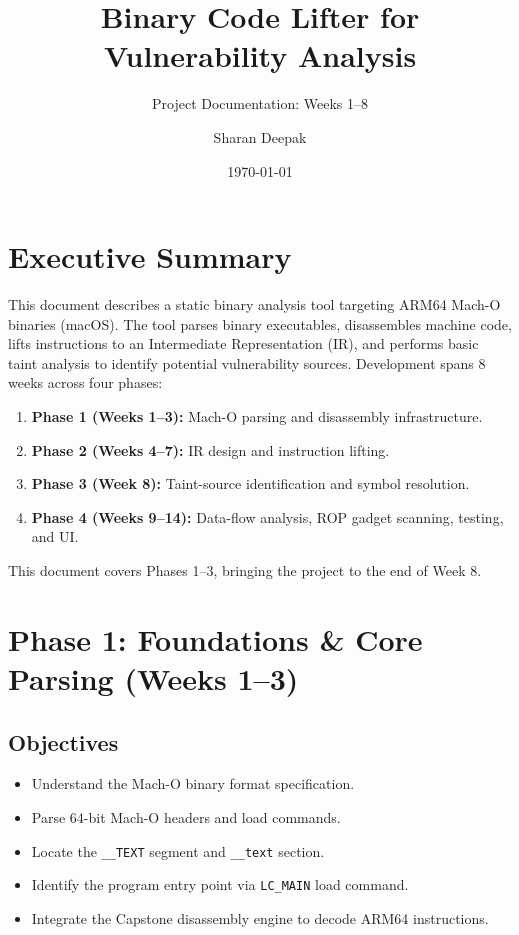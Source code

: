 \documentclass[12pt,a4paper]{article}
\title{Binary Code Lifter for Vulnerability Analysis}
\subtitle{Project Documentation: Weeks 1--8}
\author{Sharan Deepak}
\date{\today}
\begin{document}
\maketitle

\tableofcontents
\newpage

\section{Executive Summary}

This document describes a static binary analysis tool targeting ARM64 Mach-O binaries (macOS). The tool parses binary executables, disassembles machine code, lifts instructions to an Intermediate Representation (IR), and performs basic taint analysis to identify potential vulnerability sources. Development spans 8 weeks across four phases:

\begin{enumerate}
  \item \textbf{Phase 1 (Weeks 1--3):} Mach-O parsing and disassembly infrastructure.
  \item \textbf{Phase 2 (Weeks 4--7):} IR design and instruction lifting.
  \item \textbf{Phase 3 (Week 8):} Taint-source identification and symbol resolution.
  \item \textbf{Phase 4 (Weeks 9--14):} Data-flow analysis, ROP gadget scanning, testing, and UI.
\end{enumerate}

This document covers Phases 1--3, bringing the project to the end of Week 8.

\newpage

\section{Phase 1: Foundations \& Core Parsing (Weeks 1--3)}

\subsection{Objectives}

\begin{itemize}
  \item Understand the Mach-O binary format specification.
  \item Parse 64-bit Mach-O headers and load commands.
  \item Locate the \texttt{\_\_TEXT} segment and \texttt{\_\_text} section.
  \item Identify the program entry point via \texttt{LC\_MAIN} load command.
  \item Integrate the Capstone disassembly engine to decode ARM64 instructions.
\end{itemize}
\end{document}
